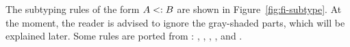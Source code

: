 %
%
%




The subtyping rules of the form $A <: B$ are shown in 
Figure~\ref{fig:fi-subtype}. 
At the moment, the reader is advised to ignore the
gray-shaded parts, which will be explained later. 
Some rules are ported from \oldname: , 
,
, ,  and
.

